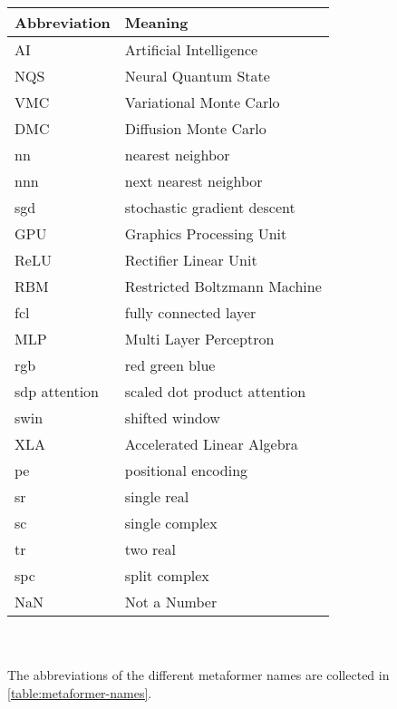 \noindent\\\\

\begin{tabular}[h]{p{3cm}|l}
	Abbreviation & Meaning\\
	\hline
	AI & Artificial Intelligence\\ 
	NQS & Neural Quantum State\\
	VMC & Variational Monte Carlo\\
	DMC & Diffusion Monte Carlo\\
	nn & nearest neighbor\\
	nnn & next nearest neighbor\\
	sgd & stochastic gradient descent\\
	GPU & Graphics Processing Unit\\
	ReLU & Rectifier Linear Unit\\
	RBM & Restricted Boltzmann Machine\\
	fcl & fully connected layer\\
	MLP & Multi Layer Perceptron\\
	rgb & red green blue\\
	sdp attention & scaled dot product attention\\
	swin & shifted window\\
	XLA & Accelerated Linear Algebra\\
	pe & positional encoding\\
	sr & single real\\
	sc & single complex\\
	tr & two real\\
	spc & split complex\\
	NaN & Not a Number \\
\end{tabular}\\\\

The abbreviations of the different metaformer names are collected in \autoref{table:metaformer-names}.

\newpage